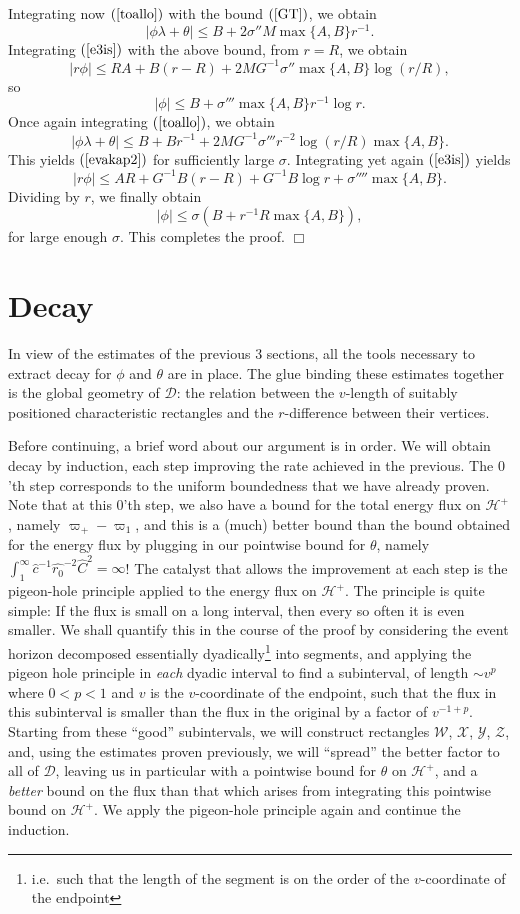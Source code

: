 \documentclass{article}
\begin{document}
Integrating now $(\ref{toallo})$ with the bound $(\ref{GT})$, 
we obtain
\[
|\phi\lambda+\theta|\le B+2\sigma''M\max\{A,B\}r^{-1}.
\]
Integrating  $(\ref{e3is})$ with the above bound, from $r=R$, we obtain
\[
|r\phi|\le RA+B(r-R)+2MG^{-1}\sigma''\max\{A,B\}\log (r/R),
\]
so 
\[
|\phi|\le B+\sigma'''\max\{A,B\}r^{-1}\log r.
\]
Once again integrating $(\ref{toallo})$, we obtain
\[
|\phi\lambda+\theta|\le B+Br^{-1}+2MG^{-1}\sigma'''r^{-2}\log (r/R)\max\{A,B\}.
\]
This yields $(\ref{evakap2})$ for sufficiently large $\sigma$.
Integrating yet again $(\ref{e3is})$ yields
\[
|r\phi|\le AR+G^{-1}B(r-R)+G^{-1}B\log r+\sigma''''\max\{A,B\}.
\]
Dividing by $r$, we finally obtain
\[
|\phi|\le \sigma(B+r^{-1}R\max\{A,B\}),
\]
for large enough $\sigma$.
This completes the proof. $\Box$






\section{Decay}
\label{partI}
In view of the estimates of the previous 3 sections,
all the tools necessary to extract decay for $\phi$ and $\theta$ are in 
place. 
The glue binding these estimates together
is the global geometry of $\mathcal{D}$: the relation between the $v$-length
of suitably positioned characteristic rectangles and the $r$-difference between their
vertices. 

Before continuing, a brief word about our argument is in order.
We will obtain decay by induction, each step improving the rate 
achieved in the previous.
The $0$'th step corresponds to the uniform boundedness that we have already proven.
Note that at this $0$'th step,
we also have a bound for the total energy flux on $\mathcal{H}^+$, namely
$\varpi_+-\varpi_1$,
and this is a (much) better bound than the bound obtained for 
the energy flux
by plugging in our pointwise bound for $\theta$, namely 
$\int_1^\infty{\hat{c}^{-1}\hat{r_0}^{-2}\hat{C}^2}=\infty$!
The catalyst that allows the improvement at each step
is the pigeon-hole principle applied to the energy flux on $\mathcal{H}^+$.
The principle is quite simple: If the flux is small on a long interval,
then every so often it is even smaller. 
We shall quantify this in the course of the proof by considering the event horizon
decomposed essentially dyadically\footnote{i.e.~such that the length of the segment
is on the order of the $v$-coordinate of the endpoint} 
into segments, and applying the pigeon hole principle in
\emph{each} dyadic interval to find a subinterval, of length $\sim v^p$ where
$0<p<1$ and $v$ is the $v$-coordinate of the endpoint, 
such that the flux in this subinterval is smaller than the flux
in the original by a factor
of $v^{-1+p}$. Starting from these ``good'' subintervals, we will construct
rectangles $\mathcal{W}$, $\mathcal{X}$, $\mathcal{Y}$, $\mathcal{Z}$, and,
using the estimates proven previously,
we will ``spread'' the better factor to all of $\mathcal{D}$,
leaving us in particular with a pointwise bound for $\theta$ on $\mathcal{H}^+$,
and a \emph{better} bound on the flux than that which arises from integrating
this pointwise bound on $\mathcal{H}^+$. We apply the pigeon-hole principle
again and continue the induction.
\end{document}
